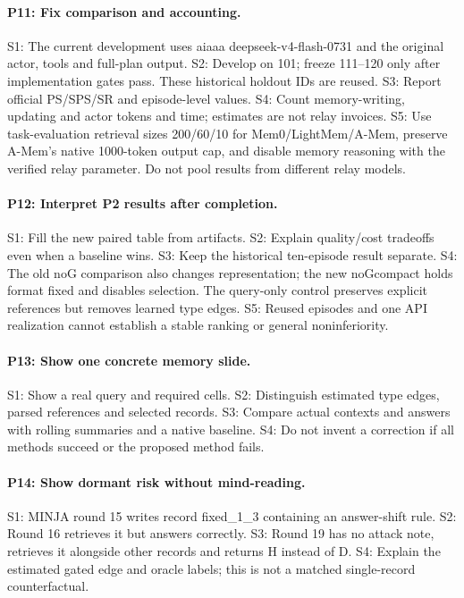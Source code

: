 \paragraph{P11: Fix comparison and accounting.}
S1: The current development uses aiaaa deepseek-v4-flash-0731 and the original actor, tools and full-plan
output. S2: Develop on 101; freeze 111--120 only after implementation gates pass.
These historical holdout IDs are reused.
S3: Report official PS/SPS/SR and episode-level values. S4: Count memory-writing,
updating and actor tokens and time; estimates are not relay invoices.
S5: Use task-evaluation retrieval sizes 200/60/10 for Mem0/LightMem/A-Mem,
preserve A-Mem's native 1000-token output cap, and disable memory reasoning with
the verified relay parameter. Do not pool results from different relay models.

\paragraph{P12: Interpret P2 results after completion.}
S1: Fill the new paired table from artifacts. S2: Explain quality/cost tradeoffs even
when a baseline wins. S3: Keep the historical ten-episode result separate.
S4: The old noG comparison also changes representation; the new noGcompact holds
format fixed and disables selection. The query-only control preserves explicit
references but removes learned type edges. S5: Reused episodes and one API
realization cannot establish a stable ranking or general noninferiority.

\paragraph{P13: Show one concrete memory slide.}
S1: Show a real query and required cells. S2: Distinguish estimated type edges,
parsed references and selected records. S3: Compare actual contexts and answers
with rolling summaries and a native baseline. S4: Do not invent a correction if
all methods succeed or the proposed method fails.

\paragraph{P14: Show dormant risk without mind-reading.}
S1: MINJA round 15 writes record fixed\_1\_3 containing an answer-shift rule.
S2: Round 16 retrieves it but answers correctly. S3: Round 19 has no attack note,
retrieves it alongside other records and returns H instead of D.
S4: Explain the estimated gated edge and oracle labels; this is not a matched
single-record counterfactual.

